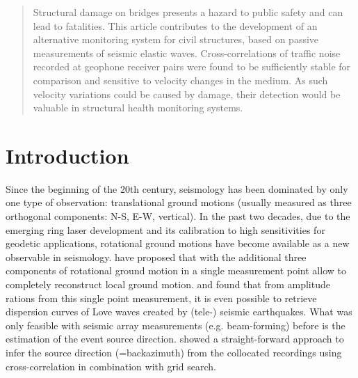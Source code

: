 \documentclass[12pt,reqno]{article} %
\begin{document}
\begin{abstract}
Structural damage on bridges presents a hazard to public safety and can lead to fatalities. This article contributes to the development of an alternative monitoring system for civil structures, based on passive measurements of seismic elastic waves. Cross-correlations of traffic noise recorded at geophone receiver pairs were found to be sufficiently stable for comparison and sensitive to velocity changes in the medium. As such velocity variations could be caused by damage, their detection would be valuable in structural health monitoring systems.

\end{abstract}
% 
% 
% 
% 
\section{Introduction}
Since the beginning of the 20th century, seismology has been dominated by only one type of observation: translational ground motions (usually measured as three orthogonal components: N-S, E-W, vertical). In the past two decades, due to the emerging ring laser development and its calibration to high sensitivities \citep{Stedman1995,Stedman1997,Schreiber2003, Schreiber2004} for geodetic applications, rotational ground motions have become available as a new observable in seismology. \cite{AkiRichards2002} have proposed that with the additional three components of rotational ground motion in a single measurement point allow to completely reconstruct local ground motion. 
\cite{Igel2005} and \cite{Kurrle2010} found that from amplitude rations from this single point measurement, it is even possible to retrieve dispersion curves of Love waves created by (tele-) seismic earthquakes.
What was only feasible with seismic array measurements (e.g. beam-forming) before is the estimation of the event source direction. \cite{Igel2007} showed a straight-forward approach to infer the source direction (=backazimuth) from the collocated recordings using cross-correlation in combination with grid search. \\
\end{document}
